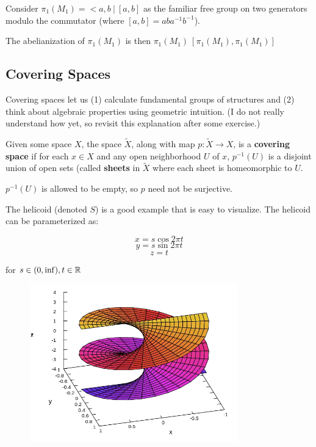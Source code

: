 \documentclass[10pt]{article}
\begin{document}
\begin{note}[Abelianization of $\pi_1(M_1)$]
	Consider $\pi_1(M_1) = < a, b ~|~ [a, b]$ as the familiar free group on two
	generators modulo the commutator (where $[a, b] = aba^{-1}b^{-1}$).

	The abelianization of $\pi_1(M_1)$ is then $\pi_1(M_1) \ [\pi_1(M_1), \pi_1(M_1)]$
\end{note}

\subsection{Covering Spaces}

Covering spaces let us (1) calculate fundamental groups of structures and (2)
think about algebraic properties using geometric intuition. (I do not really
understand how yet, so revisit this explanation after some exercise.)

\begin{definition}

	Given some space $X$, the space $\tilde{X}$, along with map $p: \tilde{X} \to
	X$, is a \textbf{covering space} if for each $x \in X$ and any open neighborhood
	$U$ of $x$, $p^{-1}(U)$ is a disjoint union of open sets (called
	\textbf{sheets} in $\tilde{X}$ where each sheet is homeomorphic to $U$.
	
	$p^{-1}(U)$ is allowed to be empty, so $p$ need not be surjective.

\end{definition}

The helicoid (denoted $S$) is a good example that is easy to visualize. The helicoid can be
parameterized as: 

\[x = s \cos 2\pi t \]
\[y = s \sin 2\pi t \]
\[z = t \]

for $s \in (0, \inf), t \in \mathbb{R}$

\begin{figure}[ht!]
\centering
\includegraphics[width=90mm]{./helicoid.png}
\caption{}
\end{figure}
\end{document}
